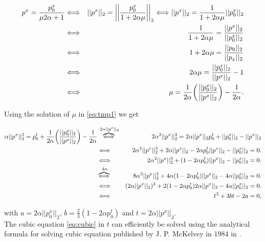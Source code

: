 \begin{enumerate}
        \begin{eqnarray}
            p^{x} = \frac{p_{0}^{x}}{\mu 2 \alpha + 1} &\Longleftrightarrow& ||p^{x}||_{2} = \bigg|\bigg| \frac{p_{0}^{x}}{1 + 2 \alpha \mu} \bigg|\bigg|_{2} \Longleftrightarrow ||p^{x}||_{2} = \frac{1}{1 + 2 \alpha \mu} ||p_{0}^{x}||_{2} \notag \\
            &\Longleftrightarrow& \frac{1}{1 + 2 \alpha \mu} = \frac{||p^{x}||_{2}}{||p_{0}^{x}||_{2}} \notag \\
            &\Longleftrightarrow& 1 + 2\alpha\mu = \frac{||p_{0}||_{2}}{||p_{x}||_{2}} \notag \\
            &\Longleftrightarrow& 2 \alpha \mu = \frac{||p_{0}^{x}||_{2}}{||p^{x}||_{2}} - 1 \notag \\
            &\Longleftrightarrow& \mu = \frac{1}{2 \alpha} \bigg( \frac{||p_{0}^{x}||_{2}}{||p^{x}||_{2}} \bigg) - \frac{1}{2\alpha}. \notag
        \end{eqnarray}

        Using the solution of $\mu$ in \ref{eq:tmp1} we get

        \begin{eqnarray}
            \alpha ||p^{x}||_{2}^{2} = p_{0}^{t} + \frac{1}{2 \alpha} \bigg( \frac{||p_{0}^{x}||_{2}}{||p^{x}||_{2}} \bigg) - \frac{1}{2\alpha} &\overbrace{\Longleftrightarrow}^{\cdot 2 \alpha ||p^{x}||_{2}}& 2 \alpha^{2} ||p^{x}||_{2}^{3} = 2 \alpha ||p^{x}||_{2} p_{0}^{t} + ||p_{0}^{x}||_{2} - ||p^{x}||_{2} \notag \\
            &\Longleftrightarrow& 2 \alpha^{2} ||p^{x}||_{2}^{3} + 2\alpha||p^{x}||_{2} - 2\alpha p_{0}^{t} ||p^{x}||_{2} - ||p_{0}^{x}||_{2} = 0. \notag \\
            &\Longleftrightarrow& 2 \alpha^{2} ||p^{x}||_{2}^{3} + (1 - 2 \alpha p_{0}^{t}) ||p^{x}||_{2} - ||p_{0}^{x}||_{2} = 0. \notag \\
            &\overbrace{\Longleftrightarrow}^{\cdot 4 \alpha}& 8 \alpha^{3} ||p^{x}||_{2}^{3} + 4 \alpha (1 - 2 \alpha p_{0}^{t}) ||p^{x}||_{2} - 4 \alpha ||p_{0}^{x}||_{2} = 0. \notag \\
            &\Longleftrightarrow& (2 \alpha ||p^{x}||_{2})^{3} + 2 (1 - 2 \alpha p_{0}^{t}) 2 \alpha ||p^{x}||_{2} - 4 \alpha ||p_{0}^{x}||_{2} = 0. \notag \\
            &\Longleftrightarrow& t^{3} + 3bt - 2a = 0, \label{eq:cubic}
        \end{eqnarray}

        with $a = 2 \alpha ||p_{0}^{x}||_{2}$, $b = \frac{2}{3}(1 - 2 \alpha p_{0}^{t})$ and $t = 2 \alpha ||p^{x}||_{2}$.\\
        The cubic equation \ref{eq:cubic} in $t$ can efficiently be solved using the analytical formula for solving cubic equation published by J. P. McKelvey in 1984 in \cite{kelvey-ajp}.

        \end{enumerate}

